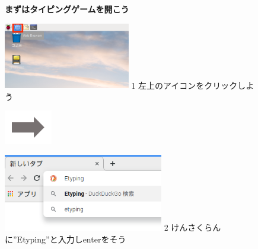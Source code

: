 \documentclass[a4paper,12pt]{jarticle}
\begin{document}
\begin{figure}[t]
  \centering


  {\centering
    \textbf{まずはタイピングゲームを開こう}
    \par}

  \centering

  \begin{minipage}{5.695cm}
    \includegraphics[width=5.523cm]{textbook-img071.png}
    1 左上のアイコンをクリックしよう
  \end{minipage}
  \includegraphics[width=2.094cm]{textbook-img084.png}
  \begin{minipage}{6.582cm}
    \includegraphics[width=6.985cm]{textbook-img083.png}
    2 けんさくらんに”Etyping”と入力しenterをそう
  \end{minipage}



\end{figure}
\end{document}

